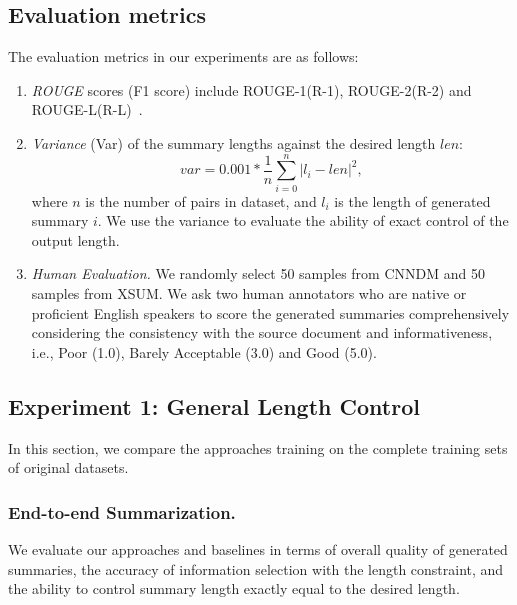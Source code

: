\subsection{Evaluation metrics}
The evaluation metrics in our experiments are as follows:
\begin{enumerate}
\item \textit{ROUGE} scores (F1 score) include  ROUGE-1(R-1), ROUGE-2(R-2) and
ROUGE-L(R-L)~\cite{rouge}.

\item \textit{Variance} (Var) of the summary lengths against
the desired length $len$:
\begin{equation}
var = 0.001 * \frac{1}{n}\sum_{i=0}^{n} |l_i - len|^2, 
\end{equation}
where $n$ is the number of pairs in dataset, and $l_i$ is the length of generated summary $i$. 
We use the variance to evaluate the
ability of exact control of the output length.

\item \textit{Human Evaluation.}
We randomly select 50 samples from CNNDM and 50 samples from XSUM.
We ask two human annotators
who are native or proficient English speakers to score 
the generated summaries comprehensively considering the consistency with the source document and informativeness,
i.e., Poor (1.0), Barely Acceptable (3.0) and Good (5.0).
\end{enumerate}

\subsection{Experiment 1: General Length Control}
\label{sec:general}
In this section, we compare the approaches training on the complete training sets of original datasets.

\subsubsection{End-to-end Summarization.}
We evaluate our approaches and baselines in terms of overall quality of generated summaries, the accuracy of information selection with the length constraint, 
and the ability to control summary length exactly equal to the desired length.

